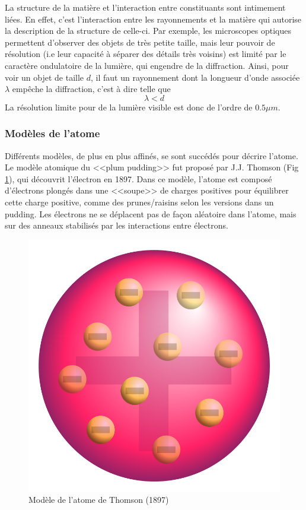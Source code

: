 La structure de la matière et l'interaction entre constituants sont intimement liées. En effet, c'est l'interaction entre les rayonnements et la matière qui autorise la description de la structure de celle-ci. Par exemple, les microscopes optiques permettent d'observer des objets de très petite taille, mais leur pouvoir de résolution (i.e leur capacité à séparer des détails très voisins) est limité par le caractère ondulatoire de la lumière, qui engendre de la diffraction. Ainsi, pour voir un objet de taille $d$, il faut un rayonnement dont la longueur d'onde associée $\lambda$ empêche la diffraction, c'est à dire telle que
\[ \lambda < d \]
La résolution limite pour de la lumière visible est donc de l'ordre de $0.5\mu m$.


\subsubsection{Modèles de l'atome}
Différents modèles, de plus en plus affinés, se sont succédés pour décrire l'atome. Le modèle atomique du <<plum pudding>> fut proposé par J.J. Thomson (Fig \ref{fig:modele_thompson}), qui découvrit l'électron en 1897. Dans ce modèle, l'atome est composé d'électrons plongés dans une <<soupe>> de charges positives pour équilibrer cette charge positive, comme des prunes/raisins selon les versions dans un pudding. Les électrons ne se déplacent pas de façon aléatoire dans l'atome, mais sur des anneaux stabilisés par les interactions entre électrons.

\begin{figure}[ht]
    \centering
    \includegraphics[scale=0.15]{Images1/thomson.png}
    \caption{Modèle de l'atome de Thomson (1897)}
    \label{fig:modele_thompson}
\end{figure}

